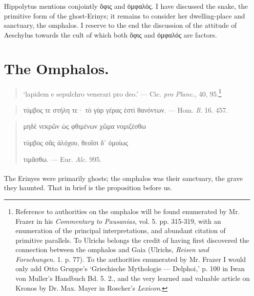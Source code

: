 \documentclass[a4paper, 11pt, oneside, polutonikogreek, english]{article}
\begin{document}
Hippolytus mentions conjointly ὄφις and ὀμφαλός. I have discussed the snake, the primitive form of the ghost-Erinys; it remains to consider her dwelling-place and sanctuary, the omphalos. I reserve to the end the discussion of the attitude of Aeschylus towards the cult of which both ὄφις and ὀμφαλός are factors.
\clearpage
\section{The Omphalos.}
\begin{quotation}
`lapidem e sepulchro venerari pro deo.' --- Cic. \emph{pro Planc.}, 40, 95.\footnote{Reference to authorities on the omphalos will be found enumerated by Mr. Frazer in his \emph{Commentary to Pausanias}, vol. 5. pp. 315-319, with an enumeration of the principal interpretations, and abundant citation of primitive parallels. To Ulrichs belongs the credit of having first discovered the connection between the omphalos and Gaia (Ulrichs, \emph{Reisen und Forschungen.} 1. p. 77). To the authorities enumerated by Mr. Frazer I would only add Otto Gruppe's `Griechische Mythologie --- Delphoi,' p. 100 in Iwan von Muller's Handbuch Bd. 5. 2., and the very learned and valuable article on Kronos by Dr. Max. Mayer in Roscher's \emph{Lexicon}.}
\end{quotation}
\begin{quotation}
τύμβος τε στήλη τε· τὸ γὰρ γέρας ἐστὶ θανόντων. --- Hom. \emph{Il.} 16. 457.
\end{quotation}
\begin{quotation}
μηδὲ νεκρῶν ὡς φθιμένων χῶμα νομιζέσθω

τύμβος σᾶς ἀλόχου, θεοῖσι δ᾽ ὁμοίως

\hspace*{5mm}τιμᾶσθω. --- Eur. \emph{Alc.} 995. 
\end{quotation}
\paragraph{}
The Erinyes were primarily ghosts; the omphalos was their sanctuary, the grave they haunted. That in brief is the proposition before us.
\end{document}
